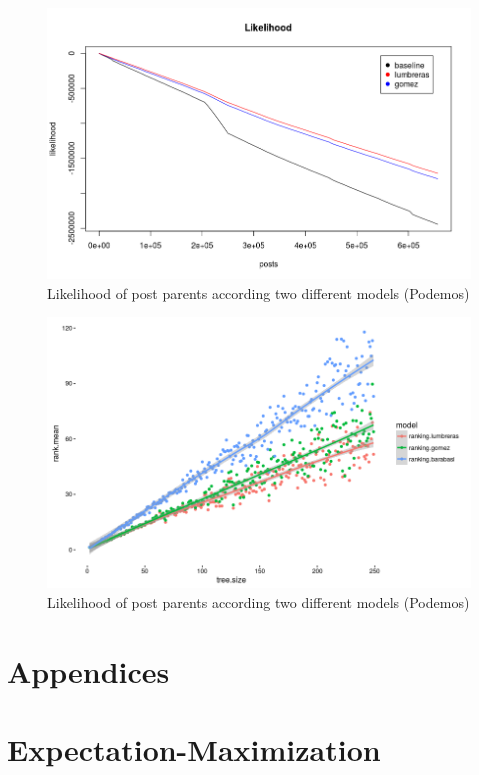 \documentclass[smallextended]{svjour3}          %
\begin{document}
\begin{figure}
\center
\includegraphics[width=1\textwidth]{predictions_likelihood_podemos}
\caption{Likelihood of post parents according two different models (Podemos)}
\end{figure}

\begin{figure}
\center
\includegraphics[width=1\textwidth]{benchmark_ranking}
\caption{Likelihood of post parents according two different models (Podemos)}
\end{figure}


\newpage
\appendix
\section*{Appendices}
\section{Expectation-Maximization}
\end{document}
